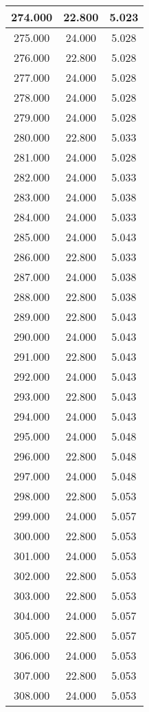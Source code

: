 \documentclass[11pt,a4paper]{jsarticle}
\begin{document}
\begin{center}
\begin{longtable}{|c|c|c|}
274.000	 & 22.800&  5.023 \\ \hline
275.000	 & 24.000&  5.028 \\ \hline
276.000	 & 22.800&  5.028 \\ \hline
277.000	 & 24.000&  5.028 \\ \hline
278.000	 & 24.000&  5.028 \\ \hline
279.000	 & 24.000&  5.028 \\ \hline
280.000	 & 22.800&  5.033 \\ \hline
281.000	 & 24.000&  5.028 \\ \hline
282.000	 & 24.000&  5.033 \\ \hline
283.000	 & 24.000&  5.038 \\ \hline
284.000	 & 24.000&  5.033 \\ \hline
285.000	 & 24.000&  5.043 \\ \hline
286.000	 & 22.800&  5.033 \\ \hline
287.000	 & 24.000&  5.038 \\ \hline
288.000	 & 22.800&  5.038 \\ \hline
289.000	 & 22.800&  5.043 \\ \hline
290.000	 & 24.000&  5.043 \\ \hline
291.000	 & 22.800&  5.043 \\ \hline
292.000	 & 24.000&  5.043 \\ \hline
293.000	 & 22.800&  5.043 \\ \hline
294.000	 & 24.000&  5.043 \\ \hline
295.000	 & 24.000&  5.048 \\ \hline
296.000	 & 22.800&  5.048 \\ \hline
297.000	 & 24.000&  5.048 \\ \hline
298.000	 & 22.800&  5.053 \\ \hline
299.000	 & 24.000&  5.057 \\ \hline
300.000	 & 22.800&  5.053 \\ \hline
301.000	 & 24.000&  5.053 \\ \hline
302.000	 & 22.800&  5.053 \\ \hline
303.000	 & 22.800&  5.053 \\ \hline
304.000	 & 24.000&  5.057 \\ \hline
305.000	 & 22.800&  5.057 \\ \hline
306.000	 & 24.000&  5.053 \\ \hline
307.000	 & 22.800&  5.053 \\ \hline
308.000	 & 24.000&  5.053 \\ \hline

\end{longtable}
\end{center}
\end{document}

